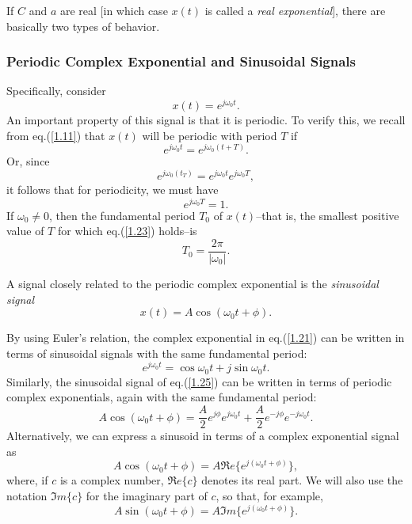 \documentclass[a4paper,twoside]{book}
\begin{document}
If $C$ and $a$ are real [in which case $x(t)$ is called a \textit{real exponential}], there are basically two types of behavior.

\subsubsection{Periodic Complex Exponential and Sinusoidal Signals}

Specifically, consider
\begin{equation}
    x(t)=e^{j\omega_0 t}.
    \label{1.21}
\end{equation}
An important property of this signal is that it is periodic. To verify this, we recall from eq.\;(\ref{1.11}) that $x(t)$ will be periodic with period $T$ if
\begin{equation}
    e^{j\omega_0 t}=e^{j\omega_0(t+T)}.
    \label{1.22}
\end{equation}
Or, since $$e^{j\omega_0(t_T)}=e^{j\omega_0 t}e^{j\omega_0 T},$$ it follows that for periodicity, we must have
\begin{equation}
    e^{j\omega_0 T}=1.
    \label{1.23}
\end{equation}
If $\omega_0\ne 0$, then the fundamental period $T_0$ of $x(t)$--that is, the smallest positive value of $T$ for which eq.\;(\ref{1.23}) holds--is
\begin{equation}
    T_0=\dfrac{2\pi}{|\omega_0|}.
    \label{1.24}
\end{equation}

A signal closely related to the periodic complex exponential is the \textit{sinusoidal signal}
\begin{equation}
    x(t)=A\cos(\omega_0t+\phi).
    \label{1.25}
\end{equation}

By using Euler's relation, the complex exponential in eq.\;(\ref{1.21}) can be written in terms of sinusoidal signals with the same fundamental period:
\begin{equation}
    e^{j\omega_0 t}=\cos\omega_0t+j\sin\omega_0t.
    \label{1.26}
\end{equation}
Similarly, the sinusoidal signal of eq.\;(\ref{1.25}) can be written in terms of periodic complex exponentials, again with the same fundamental period:
\begin{equation}
    A\cos(\omega_{0}t+\phi)=\frac{A}{2}e^{j\phi}e^{j\omega_{0}t}+\frac{A}{2}e^{-j\phi}e^{-j\omega_{0}t}.
    \label{1.27}
\end{equation}
Alternatively, we can express a sinusoid in terms of a complex exponential signal as
\begin{equation}
    A\cos(\omega_0t+\phi)=A\Re e\{e^{j(\omega_0t+\phi)}\},
    \label{1.28}
\end{equation}
where, if $c$ is a complex number, $\Re e\{c\}$ denotes its real part. We will also use the notation $\Im m\{c\}$ for the imaginary part of $c$, so that, for example,
\begin{equation}
    A\sin(\omega_0t+\phi)=A\Im m\{e^{j(\omega_0t+\phi)}\}.
    \label{1.29}
\end{equation}
\end{document}
